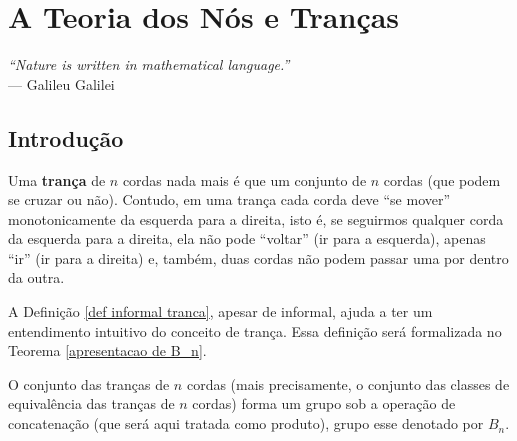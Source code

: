 \chapter[A Teoria dos Nós e Tranças]{A Teoria dos Nós e Tranças}
\label{cap-3}
\chaptermark{}
%
\hfill%
\begin{minipage}{10cm}
\begin{flushright}
\rightskip=0.5cm
\textit{``Nature is written in mathematical language.''}
\\[0.1cm]
\rightskip=0.5cm
--- Galileu Galilei
\end{flushright}
\end{minipage}

\section{Introdução}
    \begin{deff}
    \label{def informal tranca}
    	Uma \textbf{trança} de $n$ cordas nada mais é que um conjunto de $n$ cordas (que podem se cruzar ou não).
    	Contudo, em uma trança cada corda deve ``se mover'' monotonicamente da esquerda para a direita, isto é, 
    	se seguirmos qualquer corda da esquerda para a direita, ela não pode ``voltar'' (ir para a esquerda),
    	apenas ``ir'' (ir para a direita) e, também, duas cordas não podem passar uma por dentro da outra.
    \end{deff}
    \par\vspace{0.3cm} A Definição \eqref{def informal tranca}, apesar de informal, ajuda a ter um entendimento
    intuitivo do conceito de trança. Essa definição será formalizada no Teorema \eqref{apresentacao de B_n}.
    	
	\par\vspace{0.3cm} O conjunto das tranças de $n$ cordas (mais precisamente, o conjunto das classes 
	de equivalência das tranças de $n$ cordas) forma um grupo sob a operação de concatenação 
	(que será aqui tratada como produto), grupo esse denotado por $B_n$. 
	
